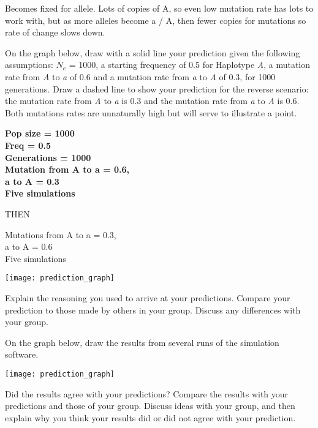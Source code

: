 \documentclass[11pt, addpoints]{exam}
\begin{document}
\begin{questions}
\begin{solution}
Becomes fixed for allele. Lots of copies of A, so even low mutation rate has lots to work with, but as more alleles become a / A, then fewer copies for mutations so rate of change slows down.
\end{solution}

\newpage

\question
On the graph below, draw with a solid line your prediction
given the following assumptions: $N_e$ = 1000, a
starting frequency of 0.5 for Haplotype \emph{A}, a mutation rate from
\emph{A} to \emph{a} of 0.6 and a mutation rate from \emph{a} to
\emph{A} of 0.3, for 1000 generations. Draw a dashed line to show your prediction for the
reverse scenario: the mutation rate from \emph{A} to \emph{a} is 0.3 and
the mutation rate from \emph{a} to \emph{A} is 0.6. Both mutations rates
are unnaturally high but will serve to illustrate a point.

\ifprintanswers
	{\bfseries 
	Pop size = 1000\\
	Freq = 0.5\\
	Generations = 1000\\
	Mutation from A to a = 0.6,\\
	a to A = 0.3\\
	Five simulations
	
	THEN
	
	Mutations from A to a = 0.3,\\
	a to A = 0.6\\
	Five simulations}\vspace{10\baselineskip}
\else
	\begin{center}
		\texttt{[image: prediction\_graph]}
	\end{center}
\fi

\question[1]
Explain the reasoning you used to arrive at your
predictions. Compare your prediction to those made by others in your
group. Discuss any differences with your group.

\newpage

\question 
On the graph below, draw the results from several runs of
the simulation software.

\begin{center}
	\texttt{[image: prediction\_graph]}
\end{center}

\question Did the results agree with your predictions? Compare the
results with your predictions and those of your group. Discuss ideas
with your group, and then explain why you think your results did or did
not agree with your prediction.


\end{questions}
\end{document}
